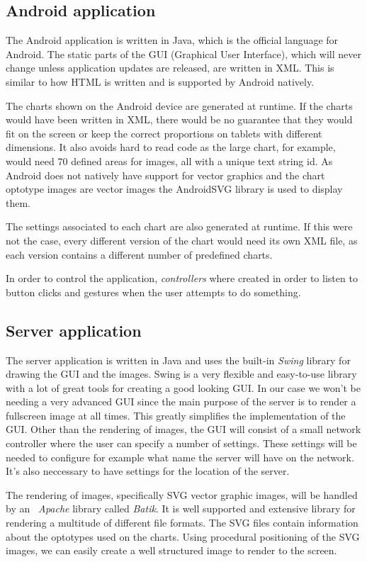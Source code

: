 \documentclass[12pt,a4paper,notitlepage]{report}
\begin{document}
\subsection{Android application}
The Android application is written in Java, which is the official language for Android. The static parts of the GUI (Graphical User Interface), which will never change unless application updates are released, are written in XML. This is similar to how HTML is written and is supported by Android natively.

The charts shown on the Android device are generated at runtime. If the charts would have been written in XML, there would be no guarantee that they would fit on the screen or keep the correct proportions on tablets with different dimensions. It also avoids hard to read code as the large chart, for example, would need 70 defined areas for images, all with a unique text string id. As Android does not natively have support for vector graphics and the chart optotype images are vector images the AndroidSVG library is used to display them. \cite{AndroidSVG}

The settings associated to each chart are also generated at runtime. If this were not the case, every different version of the chart would need its own XML file, as each version contains a different number of predefined charts.

In order to control the application, \textit{controllers} where created in order to listen to button clicks and gestures when the user attempts to do something.

\subsection{Server application}
The server application is written in Java and uses the built-in \textit{Swing} library for drawing the GUI and the images. Swing is a very flexible and easy-to-use library with a lot of great tools for creating a good looking GUI. In our case
we won't be needing a very advanced GUI since the main purpose of the server is to render a fullscreen image at all times. This greatly simplifies the implementation of the GUI. Other than the rendering of images, the GUI will consist of a small network controller where the user can specify a number of settings. These settings will be needed to configure for example what name the server will have on the network. It's also neccessary to have settings for the location of the server.

The rendering of images, specifically SVG vector graphic images, will be handled by an \textit{~Apache} library called \textit{Batik}. It is well supported and extensive library for rendering a multitude of different file formats. The SVG files contain information about the optotypes used on the charts. Using procedural positioning of the SVG images, we can easily create a well structured image to render to the screen.
\end{document}
